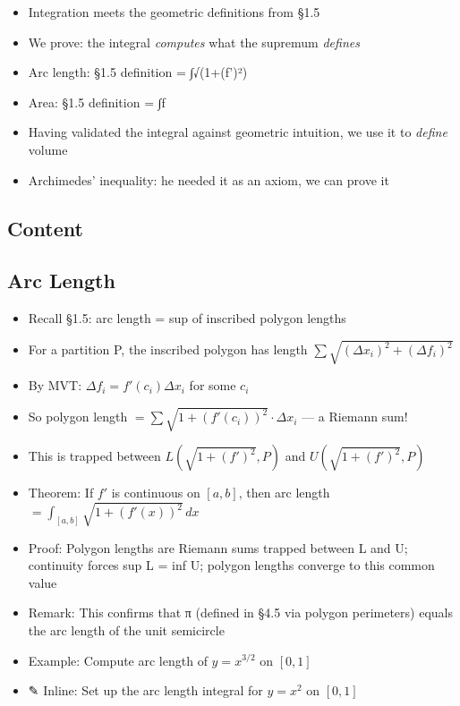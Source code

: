 \documentclass[
  10pt,
  letterpaper,
]{scrbook}
\providecommand{\tightlist}{%
  \setlength{\itemsep}{0pt}\setlength{\parskip}{0pt}}
\begin{document}
\begin{itemize}
\tightlist
\item
  Integration meets the geometric definitions from §1.5
\item
  We prove: the integral \emph{computes} what the supremum
  \emph{defines}
\item
  Arc length: §1.5 definition = ∫√(1+(f')²)
\item
  Area: §1.5 definition = ∫f
\item
  Having validated the integral against geometric intuition, we use it
  to \emph{define} volume
\item
  Archimedes' inequality: he needed it as an axiom, we can prove it
\end{itemize}

\subsection{Content}\label{content-36}

\subsection{Arc Length}\label{arc-length}

\begin{itemize}
\tightlist
\item
  Recall §1.5: arc length = sup of inscribed polygon lengths
\item
  For a partition P, the inscribed polygon has length
  \(\sum \sqrt{(\Delta x_i)^2 + (\Delta f_i)^2}\)
\item
  By MVT: \(\Delta f_i = f'(c_i) \Delta x_i\) for some \(c_i\)
\item
  So polygon length \(= \sum \sqrt{1 + (f'(c_i))^2} \cdot \Delta x_i\)
  --- a Riemann sum!
\item
  This is trapped between \(L(\sqrt{1+(f')^2}, P)\) and
  \(U(\sqrt{1+(f')^2}, P)\)
\item
  Theorem: If \(f'\) is continuous on \([a,b]\), then arc length
  \(= \int_{[a,b]} \sqrt{1 + (f'(x))^2} \, dx\)
\item
  Proof: Polygon lengths are Riemann sums trapped between L and U;
  continuity forces sup L = inf U; polygon lengths converge to this
  common value
\item
  Remark: This confirms that π (defined in §4.5 via polygon perimeters)
  equals the arc length of the unit semicircle
\item
  Example: Compute arc length of \(y = x^{3/2}\) on \([0, 1]\)
\item
  ✎ Inline: Set up the arc length integral for \(y = x^2\) on \([0, 1]\)
\end{itemize}
\end{document}

